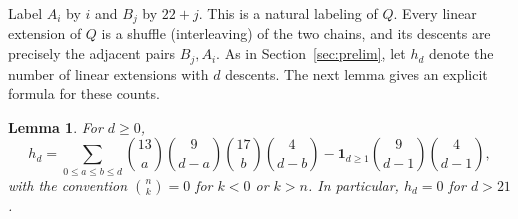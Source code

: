 \documentclass[11pt]{amsart}
\newtheorem{lemma}[theorem]{Lemma}
\theoremstyle{remark}
\numberwithin{equation}{section}
\begin{document}
Label $A_i$ by $i$ and $B_j$ by $22+j$. This is a natural labeling of $Q$.
Every linear extension of $Q$ is a shuffle (interleaving) of the two chains,
and its descents are precisely the adjacent pairs $B_j,A_i$. As in
Section~\ref{sec:prelim}, let $h_d$ denote the number of linear extensions with
$d$ descents. The next lemma gives an explicit formula for these counts.

\begin{lemma}\label{lem:Qdescents}
For $d\ge0$,
\begin{equation}\label{eq:Qh}
 h_d=\sum_{0\le a\le b\le d}\binom{13}{a}\binom{9}{d-a}\binom{17}{b}\binom{4}{d-b}
 -\mathbf 1_{d\ge1}\binom{9}{d-1}\binom{4}{d-1},
\end{equation}
with the convention $\binom nk=0$ for $k<0$ or $k>n$. In particular, $h_d=0$ for
$d>21$.
\end{lemma}
\end{document}
